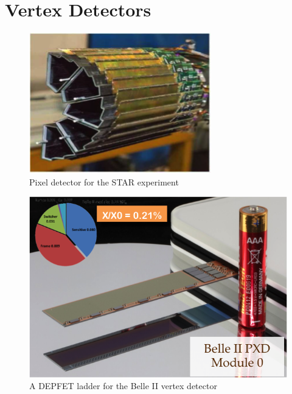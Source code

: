 \section{Vertex Detectors}

\begin{figure}
    \centering
    \includegraphics[width=.5\linewidth]{Spinoffs/STAR.png}
    \caption{Pixel detector for the STAR experiment}
    \label{fig:spinoffs:star}
\end{figure}

\begin{figure}
    \centering
    \includegraphics[width=.5\linewidth]{Spinoffs/BelleII_DEPFET.png}
    \caption{A DEPFET ladder for the Belle II vertex detector}
    \label{fig:spinoffs:belleII}
\end{figure}

